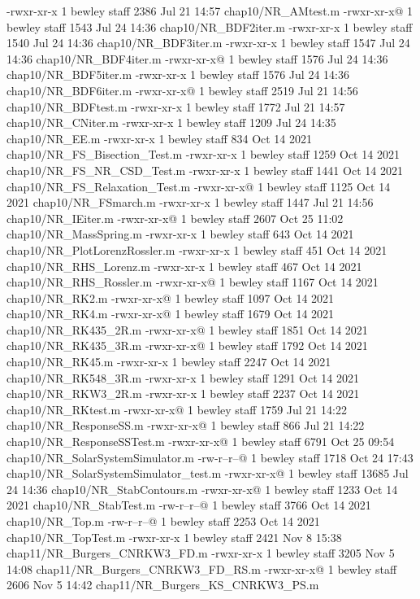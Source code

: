 -rwxr-xr-x  1 bewley  staff   2386 Jul 21 14:57 chap10/NR_AMtest.m
-rwxr-xr-x@ 1 bewley  staff   1543 Jul 24 14:36 chap10/NR_BDF2iter.m
-rwxr-xr-x  1 bewley  staff   1540 Jul 24 14:36 chap10/NR_BDF3iter.m
-rwxr-xr-x  1 bewley  staff   1547 Jul 24 14:36 chap10/NR_BDF4iter.m
-rwxr-xr-x@ 1 bewley  staff   1576 Jul 24 14:36 chap10/NR_BDF5iter.m
-rwxr-xr-x  1 bewley  staff   1576 Jul 24 14:36 chap10/NR_BDF6iter.m
-rwxr-xr-x@ 1 bewley  staff   2519 Jul 21 14:56 chap10/NR_BDFtest.m
-rwxr-xr-x  1 bewley  staff   1772 Jul 21 14:57 chap10/NR_CNiter.m
-rwxr-xr-x  1 bewley  staff   1209 Jul 24 14:35 chap10/NR_EE.m
-rwxr-xr-x  1 bewley  staff    834 Oct 14  2021 chap10/NR_FS_Bisection_Test.m
-rwxr-xr-x  1 bewley  staff   1259 Oct 14  2021 chap10/NR_FS_NR_CSD_Test.m
-rwxr-xr-x  1 bewley  staff   1441 Oct 14  2021 chap10/NR_FS_Relaxation_Test.m
-rwxr-xr-x@ 1 bewley  staff   1125 Oct 14  2021 chap10/NR_FSmarch.m
-rwxr-xr-x  1 bewley  staff   1447 Jul 21 14:56 chap10/NR_IEiter.m
-rwxr-xr-x@ 1 bewley  staff   2607 Oct 25 11:02 chap10/NR_MassSpring.m
-rwxr-xr-x  1 bewley  staff    643 Oct 14  2021 chap10/NR_PlotLorenzRossler.m
-rwxr-xr-x  1 bewley  staff    451 Oct 14  2021 chap10/NR_RHS_Lorenz.m
-rwxr-xr-x  1 bewley  staff    467 Oct 14  2021 chap10/NR_RHS_Rossler.m
-rwxr-xr-x@ 1 bewley  staff   1167 Oct 14  2021 chap10/NR_RK2.m
-rwxr-xr-x@ 1 bewley  staff   1097 Oct 14  2021 chap10/NR_RK4.m
-rwxr-xr-x@ 1 bewley  staff   1679 Oct 14  2021 chap10/NR_RK435_2R.m
-rwxr-xr-x@ 1 bewley  staff   1851 Oct 14  2021 chap10/NR_RK435_3R.m
-rwxr-xr-x@ 1 bewley  staff   1792 Oct 14  2021 chap10/NR_RK45.m
-rwxr-xr-x  1 bewley  staff   2247 Oct 14  2021 chap10/NR_RK548_3R.m
-rwxr-xr-x  1 bewley  staff   1291 Oct 14  2021 chap10/NR_RKW3_2R.m
-rwxr-xr-x  1 bewley  staff   2237 Oct 14  2021 chap10/NR_RKtest.m
-rwxr-xr-x@ 1 bewley  staff   1759 Jul 21 14:22 chap10/NR_ResponseSS.m
-rwxr-xr-x@ 1 bewley  staff    866 Jul 21 14:22 chap10/NR_ResponseSSTest.m
-rwxr-xr-x@ 1 bewley  staff   6791 Oct 25 09:54 chap10/NR_SolarSystemSimulator.m
-rw-r--r--@ 1 bewley  staff   1718 Oct 24 17:43 chap10/NR_SolarSystemSimulator_test.m
-rwxr-xr-x@ 1 bewley  staff  13685 Jul 24 14:36 chap10/NR_StabContours.m
-rwxr-xr-x@ 1 bewley  staff   1233 Oct 14  2021 chap10/NR_StabTest.m
-rw-r--r--@ 1 bewley  staff   3766 Oct 14  2021 chap10/NR_Top.m
-rw-r--r--@ 1 bewley  staff   2253 Oct 14  2021 chap10/NR_TopTest.m
-rwxr-xr-x  1 bewley  staff   2421 Nov  8 15:38 chap11/NR_Burgers_CNRKW3_FD.m
-rwxr-xr-x  1 bewley  staff   3205 Nov  5 14:08 chap11/NR_Burgers_CNRKW3_FD_RS.m
-rwxr-xr-x@ 1 bewley  staff   2606 Nov  5 14:42 chap11/NR_Burgers_KS_CNRKW3_PS.m
